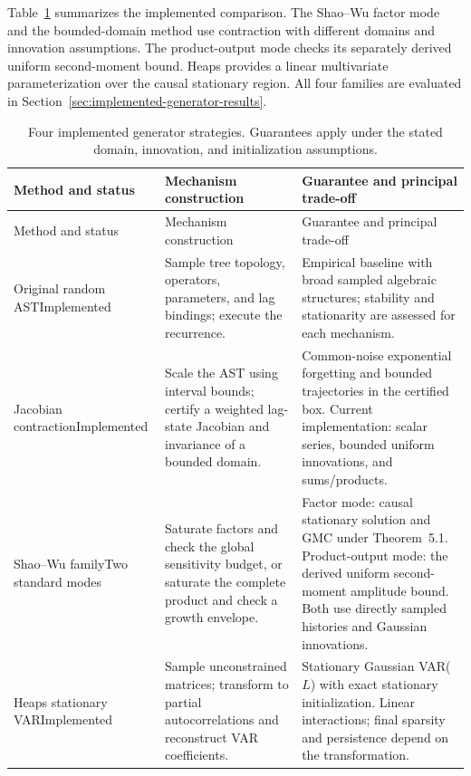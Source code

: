 Table~\ref{tab:four-generator-strategies} summarizes the implemented
comparison. The Shao--Wu factor mode and the bounded-domain method use
contraction with different domains and innovation assumptions. The
product-output mode checks its separately derived uniform second-moment
bound. Heaps provides a linear multivariate
parameterization over the causal stationary region. All four families are
evaluated in Section~\ref{sec:implemented-generator-results}.

\begingroup
\small
\renewcommand{\arraystretch}{1.12}
\begin{longtable}{@{}
>{\raggedright\arraybackslash}p{}
>{\raggedright\arraybackslash}p{}
>{\raggedright\arraybackslash}p{}@{}}
\caption{Four implemented generator strategies. Guarantees apply
under the stated domain, innovation, and initialization assumptions.}
\label{tab:four-generator-strategies}\\
\toprule
Method and status & Mechanism construction & Guarantee and principal trade-off\\
\midrule
\endfirsthead
\toprule
Method and status & Mechanism construction & Guarantee and principal trade-off\\
\midrule
\endhead
\bottomrule
\endlastfoot
Original random AST\newline Implemented &
Sample tree topology, operators, parameters, and lag bindings; execute the
recurrence. &
Empirical baseline with broad sampled algebraic structures; stability and
stationarity are assessed for each mechanism.\\
\addlinespace
Jacobian contraction\newline Implemented &
Scale the AST using interval bounds; certify a weighted lag-state Jacobian
and invariance of a bounded domain. &
Common-noise exponential forgetting and bounded trajectories in the certified
box. Current implementation: scalar series, bounded uniform innovations,
and sums/products.\\
\addlinespace
Shao--Wu family\newline Two standard modes &
Saturate factors and check the global sensitivity budget, or saturate the
complete product and check a growth envelope. &
Factor mode: causal stationary solution and GMC under Theorem~5.1.
Product-output mode: the derived uniform second-moment amplitude bound.
Both use directly sampled histories and Gaussian innovations.\\
\addlinespace
Heaps stationary VAR\newline Implemented &
Sample unconstrained matrices; transform to partial autocorrelations and
reconstruct VAR coefficients. &
Stationary Gaussian VAR($L$) with exact stationary initialization. Linear
interactions; final sparsity and persistence depend on the transformation.\\
\end{longtable}
\endgroup


